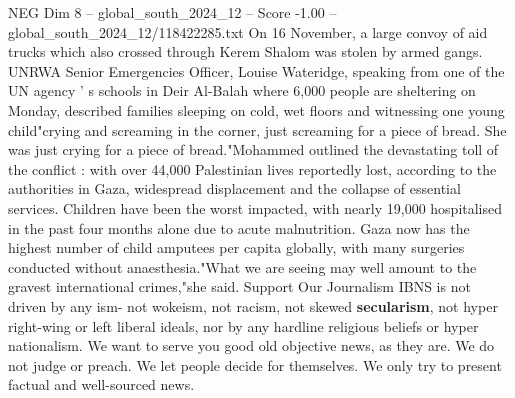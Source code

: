 \begin{textsample}{NEG Dim 8 – global\_south\_2024\_12 – Score -1.00 – global\_south\_2024\_12/118422285.txt}
On 16 November, a large convoy of aid trucks which also crossed through Kerem Shalom was stolen by armed gangs.
UNRWA Senior Emergencies Officer, Louise Wateridge, speaking from one of the UN agency ' s schools in Deir Al-Balah where 6,000 people are sheltering on Monday, described families sleeping on cold, wet floors and witnessing one young child"crying and screaming in the corner, just screaming for a piece of bread.
She was just crying for a piece of bread."Mohammed outlined the devastating toll of the conflict : with over 44,000 Palestinian lives reportedly lost, according to the authorities in Gaza, widespread displacement and the collapse of essential services.
Children have been the worst impacted, with nearly 19,000 hospitalised in the past four months alone due to acute malnutrition.
Gaza now has the highest number of child amputees per capita globally, with many surgeries conducted without anaesthesia."What we are seeing may well amount to the gravest international crimes,"she said.
Support Our Journalism IBNS is not driven by any ism- not wokeism, not racism, not skewed \textbf{secularism}, not hyper right-wing or left liberal ideals, nor by any hardline religious beliefs or hyper nationalism.
We want to serve you good old objective news, as they are.
We do not judge or preach.
We let people decide for themselves.
We only try to present factual and well-sourced news.

\end{textsample}
